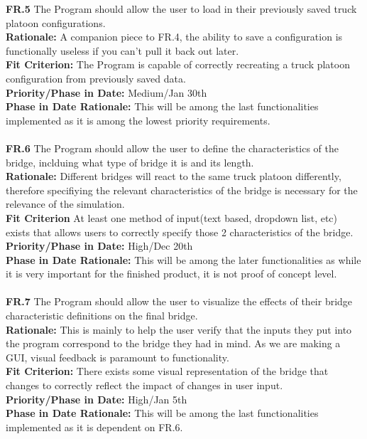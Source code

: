 \documentclass[12pt]{article}
\begin{document}
  \noindent\textbf{FR.5} The Program should allow the user to load in their previously saved truck platoon configurations.\\
  \textbf{Rationale:} A companion piece to FR.4, the ability to save a configuration is functionally useless if you can't pull it back out later.\\
  \textbf{Fit Criterion:} The Program is capable of correctly recreating a truck platoon configuration from previously saved data.\\
  \textbf{Priority/Phase in Date:} Medium/Jan 30th\\
  \textbf{Phase in Date Rationale:} This will be among the last functionalities implemented as it is among the lowest priority requirements.\\\\

  \noindent\textbf{FR.6} The Program should allow the user to define the characteristics of the bridge, inclduing what type of bridge it is and its length.\\
  \textbf{Rationale:} Different bridges will react to the same truck platoon differently, therefore specifiying the relevant characteristics of the bridge is necessary for
  the relevance of the simulation.\\
  \textbf{Fit Criterion} At least one method of input(text based, dropdown list, etc) exists that allows users to correctly specify those 2 characteristics of the bridge.\\
  \textbf{Priority/Phase in Date:} High/Dec 20th\\
  \textbf{Phase in Date Rationale:} This will be among the later functionalities as while it is very important for the finished product, it is not proof of concept level.\\\\
  
  \noindent\textbf{FR.7} The Program should allow the user to visualize the effects of their bridge characteristic definitions on the final bridge.\\
  \textbf{Rationale:} This is mainly to help the user verify that the inputs they put into the program correspond to the bridge they had in mind. As we are making a GUI,
  visual feedback is paramount to functionality.\\
  \textbf{Fit Criterion:} There exists some visual representation of the bridge that changes to correctly reflect the impact of changes in user input.\\
  \textbf{Priority/Phase in Date:} High/Jan 5th\\
  \textbf{Phase in Date Rationale:} This will be among the last functionalities implemented as it is dependent on FR.6.\\\\
  
\end{document}
